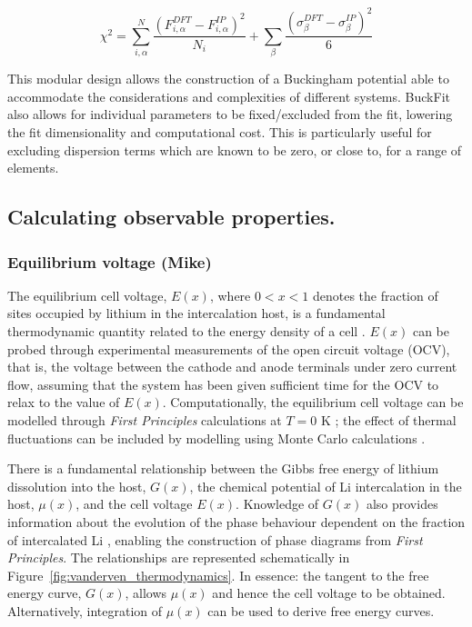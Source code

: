 \documentclass[../main.tex]{subfiles}
\begin{document}
\begin{equation}
    \chi^2 = \sum^{N}_{i,\alpha} \frac{(F^{DFT}_{i,\alpha} - F^{IP}_{i,\alpha})^2}{N_i} +  \sum_{\beta} \frac{(\sigma^{DFT}_{\beta} - \sigma^{IP}_{\beta})^2}{6}
\end{equation}

This modular design allows the construction of a Buckingham potential able to accommodate the considerations and complexities of different systems. BuckFit also allows for individual parameters to be fixed/excluded from the fit, lowering the fit dimensionality and computational cost. This is particularly useful for excluding dispersion terms which are known to be zero, or close to, for a range of elements. \cite{Lee2013_lithium,fisher2008lithium}

\subsection{Calculating observable properties.}
\subsubsection{Equilibrium voltage (Mike)}
\label{sec:properties_equilibriumvoltage}
The equilibrium cell voltage, $E(x)$, where $0 < x < 1$ denotes the fraction of sites occupied by lithium in the intercalation host, is a fundamental thermodynamic quantity related to the energy density of a cell \cite{Urban2016,CEDER1999131,VanderVen2020}. $E(x)$ can be probed through experimental measurements of the open circuit voltage (OCV), that is, the voltage between the cathode and anode terminals under zero current flow, assuming that the system has been given sufficient time for the OCV to relax to the value of $E(x)$. Computationally, the equilibrium cell voltage can be modelled through \textit{First Principles} calculations at $T = 0$ K \cite{Urban2016,CEDER1999131,VanderVen2020}; the effect of thermal fluctuations can be included by modelling using Monte Carlo calculations \cite{mercer_influence_2017,Kim2001h}.

There is a fundamental relationship between the Gibbs free energy of lithium dissolution into the host, $G(x)$, the chemical potential of Li intercalation in the host, $\mu(x)$, and the cell voltage $E(x)$. Knowledge of $G(x)$ also provides information about the evolution of the phase behaviour dependent on the fraction of intercalated Li \cite{CEDER1999131,persson2010,VanderVen2020,VanDerVen2000b}, enabling the construction of phase diagrams from \textit{First Principles}. The relationships are represented schematically in Figure~\ref{fig:vanderven_thermodynamics}. In essence: the tangent to the free energy curve, $G(x)$, allows $\mu(x)$ and hence the cell voltage to be obtained. Alternatively, integration of $\mu(x)$ can be used to derive free energy curves. 
\end{document}
